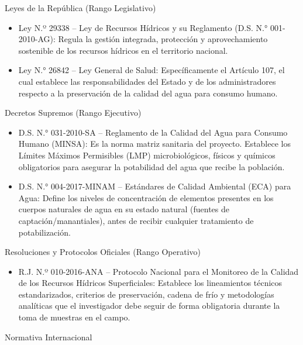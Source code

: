 Leyes de la República (Rango Legislativo)
\begin{itemize}
    \item Ley N.º 29338 – Ley de Recursos Hídricos y su Reglamento (D.S. N.° 001-2010-AG): Regula la gestión integrada, protección y aprovechamiento sostenible de los recursos hídricos en el territorio nacional.
    \item Ley N.° 26842 – Ley General de Salud: Específicamente el Artículo 107, el cual establece las responsabilidades del Estado y de los administradores respecto a la preservación de la calidad del agua para consumo humano.
\end{itemize}

Decretos Supremos (Rango Ejecutivo)

\begin{itemize}
    \item D.S. N.° 031-2010-SA – Reglamento de la Calidad del Agua para Consumo Humano (MINSA): Es la norma matriz sanitaria del proyecto. Establece los Límites Máximos Permisibles (LMP) microbiológicos, físicos y químicos obligatorios para asegurar la potabilidad del agua que recibe la población.
    \item D.S. N.° 004-2017-MINAM – Estándares de Calidad Ambiental (ECA) para Agua: Define los niveles de concentración de elementos presentes en los cuerpos naturales de agua en su estado natural (fuentes de captación/manantiales), antes de recibir cualquier tratamiento de potabilización.
\end{itemize}

Resoluciones y Protocolos Oficiales (Rango Operativo)

\begin{itemize}
    \item R.J. N.º 010-2016-ANA – Protocolo Nacional para el Monitoreo de la Calidad de los Recursos Hídricos Superficiales: Establece los lineamientos técnicos estandarizados, criterios de preservación, cadena de frío y metodologías analíticas que el investigador debe seguir de forma obligatoria durante la toma de muestras en el campo.
\end{itemize}

Normativa Internacional

